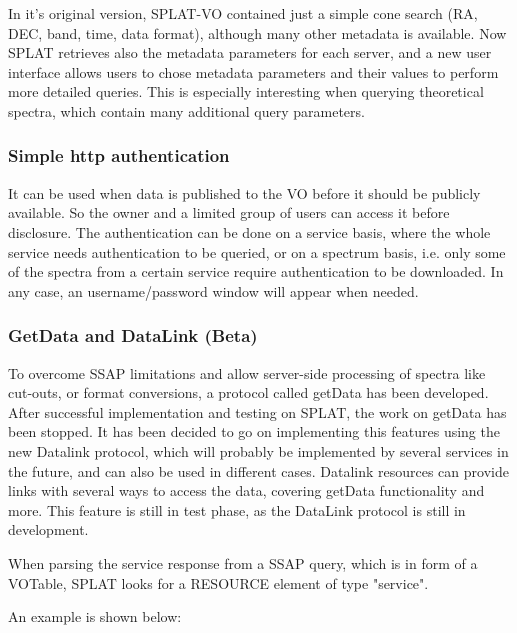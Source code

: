 \documentclass[final,authoryear,5p,times,twocolumn]{elsarticle}
\begin{document}
In it's original version, SPLAT-VO contained just a simple cone search
(RA, DEC, band, time, data format), although many other metadata is
available.  Now SPLAT retrieves also the metadata parameters for each
server, and a new user interface allows users to chose metadata
parameters and their values to perform more detailed queries.  This is
especially interesting when querying theoretical spectra, which
contain many additional query parameters.

\subsubsection{Simple http authentication}

It can be used when data is published to the VO before it should be
publicly available. So the owner and a limited group of users can
access it before disclosure. The authentication can be done on a
service basis, where the whole service needs authentication to be
queried, or on a spectrum basis, i.e. only some of the spectra from a
certain service require authentication to be downloaded. In any case,
an username/password window will appear when needed.

\subsubsection{GetData and DataLink (Beta)}

To overcome SSAP limitations and allow server-side processing of
spectra like cut-outs, or format conversions, a protocol called
getData has been developed. After successful implementation and
testing on SPLAT, the work on getData has been stopped. It has been
decided to go on implementing this features using the new Datalink
protocol, which will probably be implemented by several services in
the future, and can also be used in different cases.  Datalink
resources can provide links with several ways to access the data,
covering getData functionality and more. This feature is still in test
phase, as the DataLink protocol is still in development.

When parsing the service response from a SSAP query, which is in form
of a VOTable, SPLAT looks for a RESOURCE element of type "service".

An example is shown below:
\end{document}
